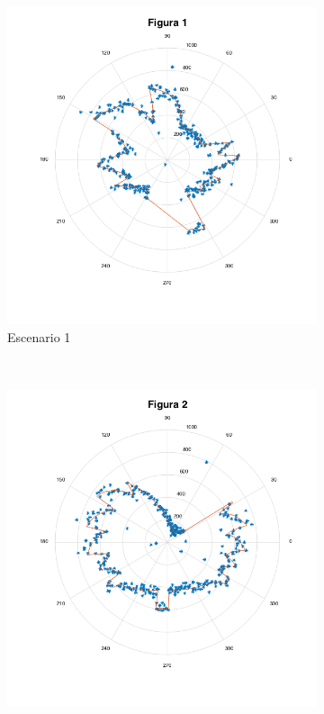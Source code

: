 \documentclass[letterpaper,11pt]{article}
\begin{document}
\begin{figure}[H]
    \centering
    \begin{subfigure}[b]{0.3\textwidth}
        \includegraphics[width=\textwidth]{img/parte_b/figura1.png}
        \caption{Escenario 1}
    \end{subfigure}
    ~ %
    \begin{subfigure}[b]{0.3\textwidth}
        \includegraphics[width=\textwidth]{img/parte_b/figura2.png}

\end{subfigure}
\end{figure}
\end{document}
